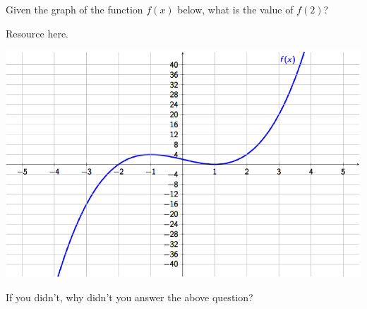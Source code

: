 \documentclass{ximera}
\begin{document}
\begin{problem} 
    Given the graph of the function $f(x)$ below, what is the value of $f(2)$?
    
    \begin{hint}
    Resource here.
    \end{hint}
    
\begin{center} \includegraphics[scale=0.7]{Graphing1.png} \end{center}
  \begin{multipleChoice}
  \end{multipleChoice}
  
  If you didn't, why didn't you answer the above question?
  
  \begin{multipleChoice}
  \end{multipleChoice}
\end{problem}
\end{document}
